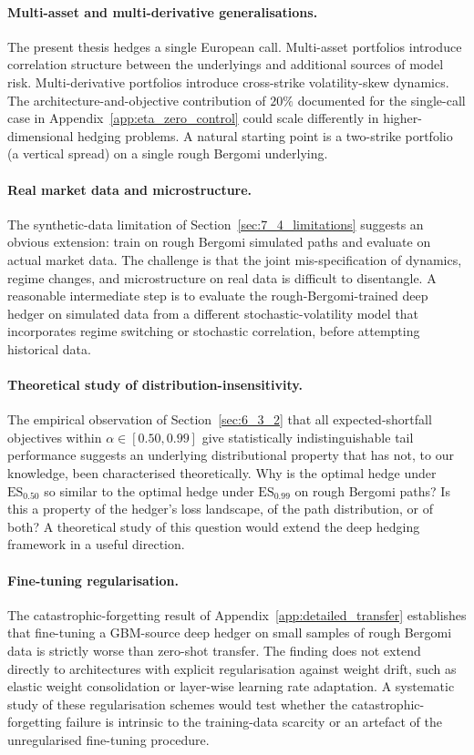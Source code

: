\documentclass[12pt,a4paper]{article}
\theoremstyle{definition}
\theoremstyle{plain}
\theoremstyle{remark}
\theoremstyle{plain}
\begin{document}
\paragraph{Multi-asset and multi-derivative generalisations.}
The present thesis hedges a single European call. Multi-asset
portfolios introduce correlation structure between the underlyings
and additional sources of model risk. Multi-derivative portfolios
introduce cross-strike volatility-skew dynamics. The
architecture-and-objective contribution of $20\%$ documented for
the single-call case in Appendix~\ref{app:eta_zero_control} could
scale differently in higher-dimensional hedging problems. A natural
starting point is a two-strike portfolio (a vertical spread) on a
single rough Bergomi underlying.

\paragraph{Real market data and microstructure.}
The synthetic-data limitation of Section~\ref{sec:7_4_limitations}
suggests an obvious extension: train on rough Bergomi simulated
paths and evaluate on actual market data. The challenge is that the
joint mis-specification of dynamics, regime changes, and
microstructure on real data is difficult to disentangle. A
reasonable intermediate step is to evaluate the
rough-Bergomi-trained deep hedger on simulated data from a
different stochastic-volatility model that incorporates regime
switching or stochastic correlation, before attempting historical
data.

\paragraph{Theoretical study of distribution-insensitivity.}
The empirical observation of Section~\ref{sec:6_3_2} that all
expected-shortfall objectives within $\alpha \in [0.50, 0.99]$ give
statistically indistinguishable tail performance suggests an
underlying distributional property that has not, to our knowledge,
been characterised theoretically. Why is the optimal hedge under
$\mathrm{ES}_{0.50}$ so similar to the optimal hedge under
$\mathrm{ES}_{0.99}$ on rough Bergomi paths? Is this a property of
the hedger's loss landscape, of the path distribution, or of both?
A theoretical study of this question would extend the deep hedging
framework in a useful direction.

\paragraph{Fine-tuning regularisation.}
The catastrophic-forgetting result of
Appendix~\ref{app:detailed_transfer} establishes that fine-tuning a
GBM-source deep hedger on small samples of rough Bergomi data is
strictly worse than zero-shot transfer. The finding does not extend
directly to architectures with explicit regularisation against
weight drift, such as elastic weight consolidation or layer-wise
learning rate adaptation. A systematic study of these regularisation
schemes would test whether the catastrophic-forgetting failure is
intrinsic to the training-data scarcity or an artefact of the
unregularised fine-tuning procedure.
\end{document}
